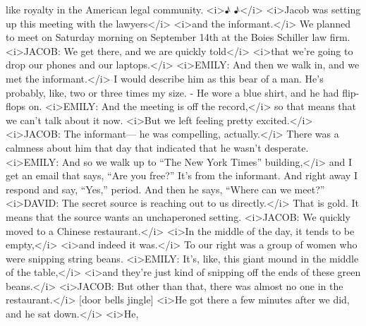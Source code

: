 \begin{itemize}
  like royalty in the American legal community.
  \textless{}i\textgreater{}♪ ♪\textless{}/i\textgreater{}
  \textless{}i\textgreater{}Jacob was setting up this meeting with the
  lawyers\textless{}/i\textgreater{} \textless{}i\textgreater{}and the
  informant.\textless{}/i\textgreater{} We planned to meet on Saturday
  morning on September 14th at the Boies Schiller law firm.
  \textless{}i\textgreater{}JACOB: We get there, and we are quickly
  told\textless{}/i\textgreater{} \textless{}i\textgreater{}that we're
  going to drop our phones and our laptops.\textless{}/i\textgreater{}
  \textless{}i\textgreater{}EMILY: And then we walk in, and we met the
  informant.\textless{}/i\textgreater{} I would describe him as this
  bear of a man. He's probably, like, two or three times my size. - He
  wore a blue shirt, and he had flip-flops on.
  \textless{}i\textgreater{}EMILY: And the meeting is off the
  record,\textless{}/i\textgreater{} so that means that we can't talk
  about it now. \textless{}i\textgreater{}But we left feeling pretty
  excited.\textless{}/i\textgreater{} \textless{}i\textgreater{}JACOB:
  The informant--- he was compelling,
  actually.\textless{}/i\textgreater{} There was a calmness about him
  that day that indicated that he wasn't desperate.
  \textless{}i\textgreater{}EMILY: And so we walk up to ``The New York
  Times'' building,\textless{}/i\textgreater{} and I get an email that
  says, ``Are you free?'' It's from the informant. And right away I
  respond and say, ``Yes,'' period. And then he says, ``Where can we
  meet?'' \textless{}i\textgreater{}DAVID: The secret source is reaching
  out to us directly.\textless{}/i\textgreater{} That is gold. It means
  that the source wants an unchaperoned setting.
  \textless{}i\textgreater{}JACOB: We quickly moved to a Chinese
  restaurant.\textless{}/i\textgreater{} \textless{}i\textgreater{}In
  the middle of the day, it tends to be
  empty,\textless{}/i\textgreater{} \textless{}i\textgreater{}and indeed
  it was.\textless{}/i\textgreater{} To our right was a group of women
  who were snipping string beans. \textless{}i\textgreater{}EMILY: It's,
  like, this giant mound in the middle of the
  table,\textless{}/i\textgreater{} \textless{}i\textgreater{}and
  they're just kind of snipping off the ends of these green
  beans.\textless{}/i\textgreater{} \textless{}i\textgreater{}JACOB: But
  other than that, there was almost no one in the
  restaurant.\textless{}/i\textgreater{} {[}door bells jingle{]}
  \textless{}i\textgreater{}He got there a few minutes after we did, and
  he sat down.\textless{}/i\textgreater{} \textless{}i\textgreater{}He,

\end{itemize}
